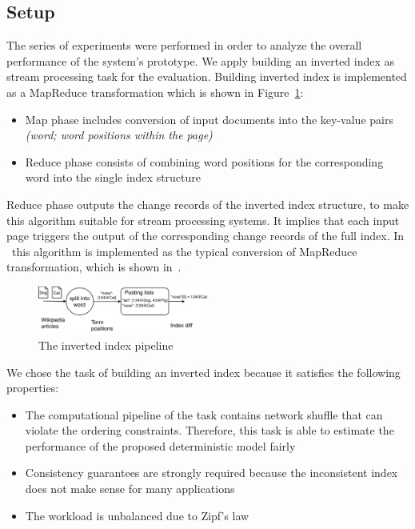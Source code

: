 
\label {fs-experiments-seciton}

\subsection{Setup}
The series of experiments were performed in order to analyze the overall performance of the system's prototype. We apply building an inverted index as stream processing task for the evaluation. Building inverted index is implemented as a MapReduce transformation which is shown in Figure~\ref{index}: 

\begin{itemize}
    \item Map phase includes conversion of input documents into the key-value pairs {\it (word; word positions within the page)}
    \item Reduce phase consists of combining word positions for the corresponding word into the single index structure 
\end{itemize}

Reduce phase outputs the change records of the inverted index structure, to make this algorithm suitable for stream processing systems. It implies that each input page triggers the output of the corresponding change records of the full index. In \FlameStream\ this algorithm is implemented as the typical conversion of MapReduce transformation, which is shown in~\cite{hiddenSeim}.

\begin{figure}[htbp]
  \centering
  \includegraphics[width=0.50\textwidth]{pics/index}
  \caption{The inverted index pipeline}
  \label {index}
\end{figure}

We chose the task of building an inverted index because it satisfies the following properties:

\begin{itemize}
    \item The computational pipeline of the task contains network shuffle that can violate the ordering constraints. Therefore, this task is able to estimate the performance of the proposed deterministic model fairly
    \item Consistency guarantees are strongly required because the inconsistent index does not make sense for many applications
    \item The workload is unbalanced due to Zipf's law
\end{itemize}

